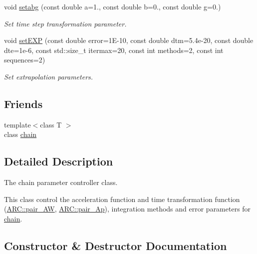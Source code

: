 \begin{DoxyCompactItemize}
void \hyperlink{classARC_1_1chainpars_a37f8af288217cbfc61a3593e21976d06}{setabg} (const double a=1., const double b=0., const double g=0.)
\begin{DoxyCompactList}\small\item\em Set time step transformation parameter. \end{DoxyCompactList}\item 
void \hyperlink{classARC_1_1chainpars_a1cacdcfc2d5b91f27cbc3c58cc8d3447}{set\+E\+XP} (const double error=1\+E-\/10, const double dtm=5.\+4e-\/20, const double dte=1e-\/6, const std\+::size\+\_\+t itermax=20, const int methods=2, const int sequences=2)
\begin{DoxyCompactList}\small\item\em Set extrapolation parameters. \end{DoxyCompactList}\end{DoxyCompactItemize}
\subsection*{Friends}
\begin{DoxyCompactItemize}
\item 
{\footnotesize template$<$class T $>$ }\\class \hyperlink{classARC_1_1chainpars_a498fbb4337b9878a5f0044996e4a2489}{chain}
\end{DoxyCompactItemize}


\subsection{Detailed Description}
The chain parameter controller class. 

This class control the acceleration function and time transformation function (\hyperlink{namespaceARC_a5c4308ca4a8d0e0ff59fdce30f00274c}{A\+R\+C\+::pair\+\_\+\+AW}, \hyperlink{namespaceARC_a819446c4644b3a3af7ef11574d0b55e0}{A\+R\+C\+::pair\+\_\+\+Ap}), integration methods and error parameters for \hyperlink{classARC_1_1chain}{chain}. 

\subsection{Constructor \& Destructor Documentation}
\hypertarget{classARC_1_1chainpars_a2019a609d85e2b801f306ac8c7f268ab}{}\label{classARC_1_1chainpars_a2019a609d85e2b801f306ac8c7f268ab} 
